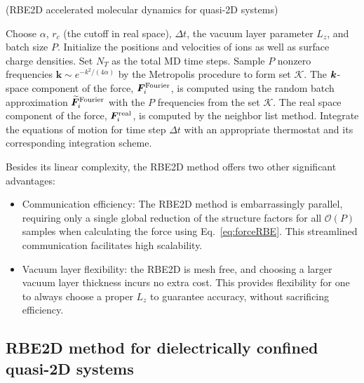 \begin{algorithm}[ht]
 \caption{(RBE2D accelerated molecular dynamics for quasi-2D systems)}\label{Alg::1}
 \begin{algorithmic}[1]
  \State Choose $\alpha$, $r_c$ (the cutoff in real space), $\Delta t$, the vacuum layer parameter $L_z$, and batch size $P$. Initialize the positions and velocities of ions as well as surface charge densities. Set $N_T$ as the total MD time steps.
  \State Sample $P$ nonzero frequencies $\bm{k}\sim e^{-k^2/(4\alpha)}$ by the Metropolis procedure to form  set $\mathcal{K}$.
  \State The $\boldsymbol{k}$-space component of the force, $\bm{F}_i^{\text{Fourier}}$, is computed using the random batch approximation $\widetilde{\boldsymbol{F}}_i^{\text{Fourier}}$ with the $P$ frequencies from the set $\mathcal{K}$.
  \State The real space component of the force, $\bm{F}_i^{\text{real}}$, is computed by the neighbor list method. %
  \State Integrate the equations of motion for time step $\Delta t$ with an appropriate thermostat and its corresponding integration scheme. %
  
  \EndFor
 \end{algorithmic}
\end{algorithm}
Besides its linear complexity, the RBE2D method offers two other significant advantages:
\begin{itemize}
    \item  {Communication efficiency: The RBE2D method is embarrassingly parallel, requiring only a single global reduction of the structure factors for all $\mathcal{O}(P)$ samples when calculating the force using Eq.~\eqref{eq:forceRBE}.} This streamlined communication facilitates high scalability. 

    \item Vacuum layer flexibility: the RBE2D is mesh free, and choosing a larger vacuum layer thickness incurs no extra cost. This provides flexibility for one to always choose a proper $L_z$ to guarantee accuracy, without sacrificing efficiency.
\end{itemize}

\subsection{RBE2D method for dielectrically confined quasi-2D systems} \label{subsec::IBCELCDielectric}

